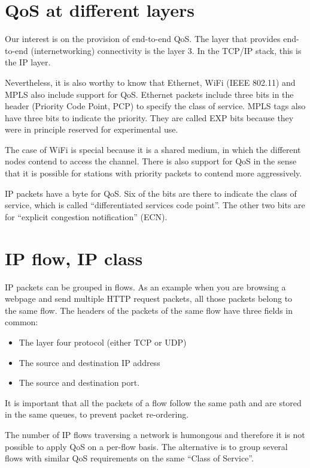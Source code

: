 \section{QoS at different layers}
Our interest is on the provision of end-to-end QoS.
The layer that provides end-to-end (internetworking) connectivity is the layer 3.
In the TCP/IP stack, this is the IP layer.

Nevertheless, it is also worthy to know that Ethernet, WiFi (IEEE 802.11) and MPLS also include support for QoS.
Ethernet packets include three bits in the header (Priority Code Point, PCP) to specify the class of service.
MPLS tags also have three bits to indicate the priority. 
They are called EXP bits because they were in principle reserved for experimental use.

The case of WiFi is special because it is a shared medium, in which the different nodes contend to access the channel.
There is also support for QoS in the sense that it is possible for stations with priority packets to contend more aggressively.

IP packets have a byte for QoS.
Six of the bits are there to indicate the class of service, which is called ``differentiated services code point''.
The other two bits are for ``explicit congestion notification'' (ECN).

\section{IP flow, IP class}

IP packets can be grouped in flows.
As an example when you are browsing a webpage and send multiple HTTP request packets, all those packets belong to the same flow.
The headers of the packets of the same flow have three fields in common:

\begin{itemize}
\item The layer four protocol (either TCP or UDP)
\item The source and destination IP address
\item The source and destination port.
\end{itemize}

It is important that all the packets of a flow follow the same path and are stored in the same queues, to prevent packet re-ordering.

The number of IP flows traversing a network is humongous and therefore it is not possible to apply QoS on a per-flow basis.
The alternative is to group several flows with similar QoS requirements on the same ``Class of Service''.

